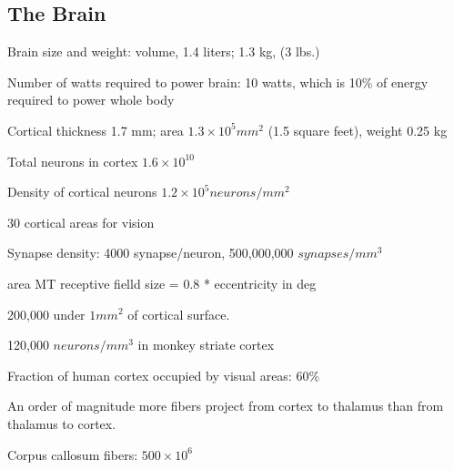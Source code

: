 
\subsection*{The Brain}

\be

\item Brain size and weight:  volume, 1.4 liters;  1.3 kg, (3 lbs.)

\item Number of watts required to power brain: 10 watts,
which is 10\% of energy required to power whole body

\item Cortical thickness 1.7 mm; area $1.3 \times 10^5 mm^2$ (1.5
square feet), weight 0.25 kg

\item Total neurons in cortex $1.6 \times 10^{10}$			


\item Density of cortical neurons $1.2 \times 10^5 neurons / mm^2$

\item 30 cortical areas for vision

\item Synapse density: 4000 synapse/neuron, 500,000,000 $synapses/{mm^3}$

\item area MT receptive fielld size = 0.8 * eccentricity in deg

\item [Macaque] 200,000 under $1 mm^2$ of cortical surface. 
\item [Macaque] 120,000 $neurons/ mm^3$ in monkey striate cortex

\item Fraction of human cortex occupied by visual areas: 60\%

\item An order of magnitude more fibers project from cortex to thalamus
than from thalamus to cortex.

\item Corpus callosum fibers: $500 \times 10^6$

\ee
